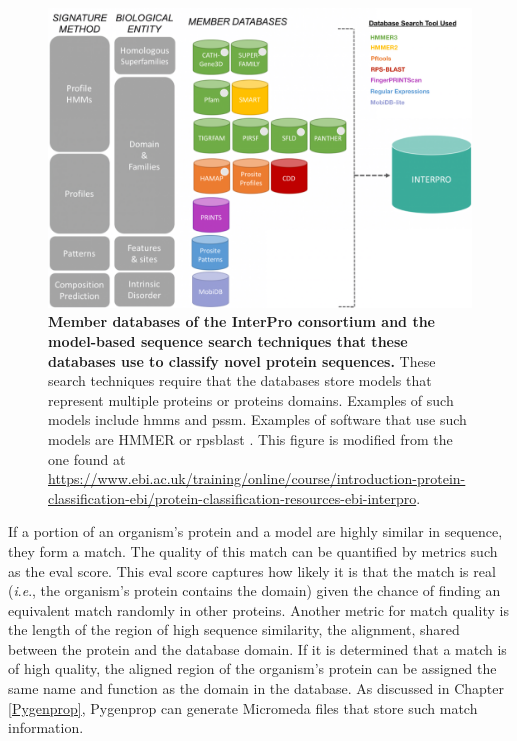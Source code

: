 \begin{figure}[!ht]
  \centering
	\includegraphics[width=\textwidth]{media/InterPro.png}
	 \caption[Member databases of the InterPro consortium and the model-based 
sequence search techniques that these databases use to classify novel protein 
sequences.]{\textbf{Member databases of the InterPro consortium and the 
model-based sequence search techniques that these databases use to classify 
novel protein sequences.} These search techniques require that the databases 
store models that represent multiple proteins or proteins domains. Examples of 
such models include \gls{hmm}s and \gls{pssm}. Examples of software that use 
such models are HMMER \cite{eddy2011accelerated} or \gls{rpsblast} 
\cite{mcginnis2004blast}. This figure is modified from the one found at 
\href{https://www.ebi.ac.uk/training/online/course/introduction-protein-classification-ebi/protein-classification-resources-ebi-interpro}{https://www.ebi.ac.uk/training/online/course/introduction-protein-classification-ebi/protein-classification-resources-ebi-interpro}.}
	 \label{fig:interpro-databases}
\end{figure}

If a portion of an organism's protein and a model are highly similar in 
sequence, they form a match. The quality of this match can be quantified by 
metrics such as the \gls{eval} score. This \gls{eval} score captures how likely 
it is that the match is real (\textit{i}.\textit{e}., the organism's protein contains the 
domain) given the chance of finding an equivalent match randomly in other 
proteins. Another metric for match quality is the length of the region of high 
sequence similarity, the alignment, shared between the protein and the database 
domain. If it is determined that a match is of high quality, the aligned region 
of the organism's protein can be assigned the same name and function as the 
domain in the database.  As discussed in Chapter \ref{Pygenprop}, Pygenprop can 
generate Micromeda files that store such match information.

